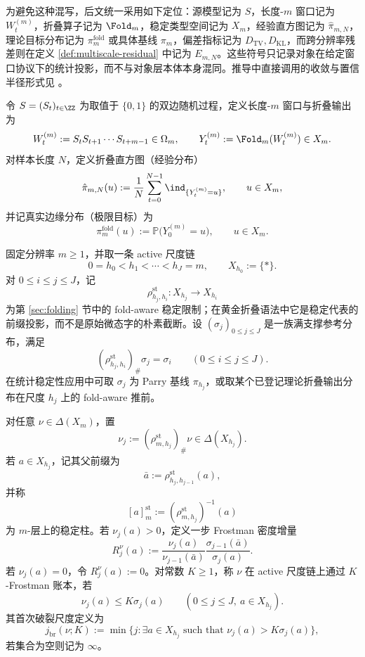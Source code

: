 为避免这种混写，后文统一采用如下定位：源模型记为 \(S\)，长度-\(m\) 窗口记为 \(W_t^{(m)}\)，折叠算子记为 \(\Fold_m\)，稳定类型空间记为 \(X_m\)，经验直方图记为 \(\hat{\pi}_{m,N}\)，理论目标分布记为 \(\pi_m^{\mathrm{fold}}\) 或具体基线 \(\pi_m\)，偏差指标记为 \(D_{\mathrm{TV}},D_{\mathrm{KL}}\)，而跨分辨率残差则在定义 \ref{def:multiscale-residual} 中记为 \(E_{m,N}\)。这些符号只记录对象在给定窗口协议下的统计投影，而不与对象层本体本身混同。推导中直接调用的收敛与置信半径形式见 \cite{WaltersErgodicTheory,WeissmanEtAl2003L1Empirical}。

\begin{definition}[一般源与折叠输出过程]\label{def:source-and-fold-output}
令 $S=(S_t)_{t\in\ZZ}$ 为取值于 $\{0,1\}$ 的双边随机过程，定义长度-$m$ 窗口与折叠输出为
\[
W_t^{(m)}:=S_tS_{t+1}\cdots S_{t+m-1}\in\Omega_m,
\qquad
Y_t^{(m)}:=\Fold_m(W_t^{(m)})\in X_m.
\]
对样本长度 $N$，定义折叠直方图（经验分布）
\[
\hat{\pi}_{m,N}(u):=\frac{1}{N}\sum_{t=0}^{N-1}\ind_{\{Y_t^{(m)}=u\}},
\qquad u\in X_m,
\]
并记真实边缘分布（极限目标）为
\[
\pi_m^{\mathrm{fold}}(u):=\mathbb{P}\bigl(Y_0^{(m)}=u\bigr),\qquad u\in X_m.
\]
\end{definition}

\begin{definition}\label{distill:bourgain-frostman_stability_thresholds-fold-aware-frostman-ledger}
固定分辨率 \(m\ge1\)，并取一条 active 尺度链
\[
0=h_0<h_1<\cdots<h_J=m,
\qquad X_{h_0}:=\{\ast\}.
\]
对 \(0\le i\le j\le J\)，记
\[
\rho^{\mathrm{st}}_{h_j,h_i}:X_{h_j}\longrightarrow X_{h_i}
\]
为第 \ref{sec:folding} 节中的 fold-aware 稳定限制；在黄金折叠语法中它是稳定代表的前缀投影，而不是原始微态字的朴素截断。设 \((\sigma_j)_{0\le j\le J}\) 是一族满支撑参考分布，满足
\[
(\rho^{\mathrm{st}}_{h_j,h_i})_\#\sigma_j=\sigma_i
\qquad(0\le i\le j\le J).
\]
在统计稳定性应用中可取 \(\sigma_j\) 为 Parry 基线 \(\pi_{h_j}\)，或取某个已登记理论折叠输出分布在尺度 \(h_j\) 上的 fold-aware 推前。

对任意 \(\nu\in\Delta(X_m)\)，置
\[
\nu_j:=(\rho^{\mathrm{st}}_{m,h_j})_\#\nu\in\Delta(X_{h_j}).
\]
若 \(a\in X_{h_j}\)，记其父前缀为
\[
\bar a:=\rho^{\mathrm{st}}_{h_j,h_{j-1}}(a),
\]
并称
\[
[a]^{\mathrm{st}}_m:=(\rho^{\mathrm{st}}_{m,h_j})^{-1}(a)
\]
为 \(m\)-层上的稳定柱。若 \(\nu_j(a)>0\)，定义一步 Frostman 密度增量
\[
R_j^\nu(a):=
\frac{\nu_j(a)}{\nu_{j-1}(\bar a)}
\frac{\sigma_{j-1}(\bar a)}{\sigma_j(a)}.
\]
若 \(\nu_j(a)=0\)，令 \(R_j^\nu(a):=0\)。对常数 \(K\ge1\)，称 \(\nu\) 在 active 尺度链上通过 \(K\)-Frostman 账本，若
\[
\nu_j(a)\le K\sigma_j(a)
\qquad(0\le j\le J,\ a\in X_{h_j}).
\]
其首次破裂尺度定义为
\[
j_{\mathrm{br}}(\nu;K):=\min\{j:\exists a\in X_{h_j}\text{ such that }\nu_j(a)>K\sigma_j(a)\},
\]
若集合为空则记为 \(\infty\)。
\end{definition}


